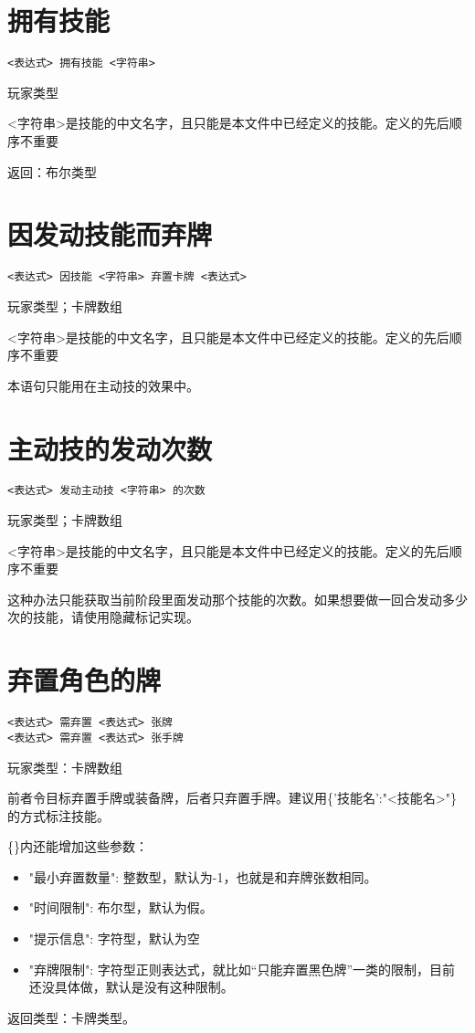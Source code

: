 \section{拥有技能}

\begin{verbatim}
<表达式> 拥有技能 <字符串>
\end{verbatim}

玩家类型

<字符串>是技能的中文名字，且只能是本文件中已经定义的技能。定义的先后顺序不重要

返回：布尔类型

\section{因发动技能而弃牌}

\begin{verbatim}
<表达式> 因技能 <字符串> 弃置卡牌 <表达式>
\end{verbatim}

玩家类型；卡牌数组

<字符串>是技能的中文名字，且只能是本文件中已经定义的技能。定义的先后顺序不重要

本语句只能用在主动技的效果中。

\section{主动技的发动次数}

\begin{verbatim}
<表达式> 发动主动技 <字符串> 的次数
\end{verbatim}

玩家类型；卡牌数组

<字符串>是技能的中文名字，且只能是本文件中已经定义的技能。定义的先后顺序不重要

这种办法只能获取当前阶段里面发动那个技能的次数。如果想要做一回合发动多少次的技能，请使用隐藏标记实现。

\section{弃置角色的牌}

\begin{verbatim}
<表达式> 需弃置 <表达式> 张牌
<表达式> 需弃置 <表达式> 张手牌
\end{verbatim}

玩家类型：卡牌数组

前者令目标弃置手牌或装备牌，后者只弃置手牌。建议用\{'技能名':"<技能名>"\}的方式标注技能。

\{\}内还能增加这些参数：

\begin{itemize}
  \item "最小弃置数量": 整数型，默认为-1，也就是和弃牌张数相同。
  \item "时间限制": 布尔型，默认为假。
  \item "提示信息": 字符型，默认为空
  \item "弃牌限制": 字符型正则表达式，就比如“只能弃置黑色牌”一类的限制，目前还没具体做，默认是没有这种限制。
\end{itemize}

返回类型：卡牌类型。